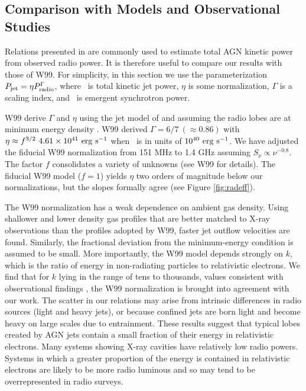 \documentclass{emulateapj}
\begin{document}
\subsection{Comparison with Models and Observational Studies}
\label{sec:models}

Relations presented in \citet[][hereafter W99]{w99} are commonly used
to estimate total AGN kinetic power from observed radio power. It is
therefore useful to compare our results with those of W99. For
simplicity, in this section we use the parameterization $P_{\rm{jet}} = \eta
P_{\rm{radio}}^{\Gamma}$, where \pjet\ is total kinetic jet power, $\eta$ is
some normalization, $\Gamma$ is a scaling index, and \prad\ is
emergent synchrotron power.

W99 derive $\Gamma$ and $\eta$ using the jet model of
\citet{1991MNRAS.250..581F} and assuming the radio lobes are at
minimum energy density \citep[see][for
  details]{1980ARA&A..18..165M}. W99 derived $\Gamma = 6/7 ~(\approx
0.86)$ with $\eta \approx f^{3/2}~4.61 \times 10^{41} ~\rm{\mbox{\ensuremath{\rm{erg}}}~\ensuremath{\rm{\mbox{\ensuremath{\rm{s}}}^{-1}}}}$ when
\prad\ is in units of $10^{40} ~\rm{\mbox{\ensuremath{\rm{erg}}}~\ensuremath{\rm{\mbox{\ensuremath{\rm{s}}}^{-1}}}}$. We have adjusted the fiducial
W99 normalization from 151 MHz to 1.4 GHz assuming $S_{\nu} \propto
\nu^{-0.8}$. The factor $f$ consolidates a variety of unknowns (see
W99 for details). The fiducial W99 model ($f=1$) yields $\eta$ two
orders of magnitude below our normalizations, but the slopes formally
agree (see Figure \ref{fig:radeff}).

The W99 normalization has a weak dependence on ambient gas density.
Using shallower and lower density gas profiles that are better matched
to X-ray observations than the profiles adopted by W99, faster jet
outflow velocities are found. Similarly, the fractional deviation from
the minimum-energy condition is assumed to be small. More importantly,
the W99 model depends strongly on $k$, which is the ratio of energy in
non-radiating particles to relativistic electrons. We find that for
$k$ lying in the range of tens to thousands, values consistent with
observational findings \citep{2005MNRAS.364.1343D,
  2006MNRAS.372.1741D, 2006ApJ...648..200D, birzan08}, the W99
normalization is brought into agreement with our work. The scatter in
our relations may arise from intrinsic differences in radio sources
(light and heavy jets), or because confined jets are born light and
become heavy on large scales due to entrainment. These results suggest
that typical lobes created by AGN jets contain a small fraction of
their energy in relativistic electrons. Many systems showing X-ray
cavities have relatively low radio powers.  Systems in which a greater
proportion of the energy is contained in relativistic electrons are
likely to be more radio luminous and so may tend to be overrepresented
in radio surveys.
\end{document}
